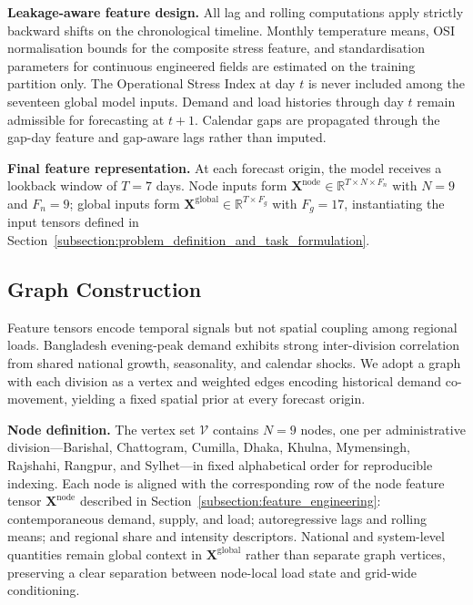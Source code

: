 \textbf{Leakage-aware feature design.} All lag and rolling computations apply strictly backward shifts on the chronological timeline. Monthly temperature means, OSI normalisation bounds for the composite stress feature, and standardisation parameters for continuous engineered fields are estimated on the training partition only. The Operational Stress Index at day \(t\) is never included among the seventeen global model inputs. Demand and load histories through day \(t\) remain admissible for forecasting at \(t+1\). Calendar gaps are propagated through the gap-day feature and gap-aware lags rather than imputed.

\textbf{Final feature representation.} At each forecast origin, the model receives a lookback window of \(T = 7\) days. Node inputs form \(\mathbf{X}^{\mathrm{node}} \in \mathbb{R}^{T \times N \times F_n}\) with \(N = 9\) and \(F_n = 9\); global inputs form \(\mathbf{X}^{\mathrm{global}} \in \mathbb{R}^{T \times F_g}\) with \(F_g = 17\), instantiating the input tensors defined in Section~\ref{subsection:problem_definition_and_task_formulation}.

\subsection{Graph Construction}\label{subsection:graph_construction}

Feature tensors encode temporal signals but not spatial coupling among regional loads. Bangladesh evening-peak demand exhibits strong inter-division correlation from shared national growth, seasonality, and calendar shocks. We adopt a graph with each division as a vertex and weighted edges encoding historical demand co-movement, yielding a fixed spatial prior at every forecast origin.

\textbf{Node definition.} The vertex set \(\mathcal{V}\) contains \(N = 9\) nodes, one per administrative division---Barishal, Chattogram, Cumilla, Dhaka, Khulna, Mymensingh, Rajshahi, Rangpur, and Sylhet---in fixed alphabetical order for reproducible indexing. Each node is aligned with the corresponding row of the node feature tensor \(\mathbf{X}^{\mathrm{node}}\) described in Section~\ref{subsection:feature_engineering}: contemporaneous demand, supply, and load; autoregressive lags and rolling means; and regional share and intensity descriptors. National and system-level quantities remain global context in \(\mathbf{X}^{\mathrm{global}}\) rather than separate graph vertices, preserving a clear separation between node-local load state and grid-wide conditioning.

